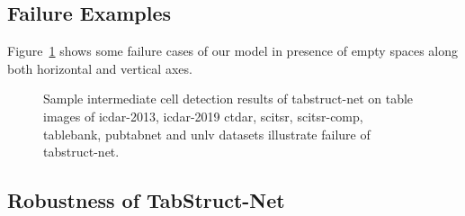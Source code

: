 \documentclass[runningheads]{llncs}
\begin{document}
\newpage
\subsection{Failure Examples}
Figure~\ref{fig_failure_cell} shows some failure cases of our model in presence of empty spaces along both horizontal and vertical axes.
\begin{figure}
\begin{center}
\hspace{-0.01\textwidth}
\hspace{-0.01\textwidth}
\vspace{0.001\textwidth}
\hspace{-0.01\textwidth}
\hspace{-0.01\textwidth}
\vspace{0.001\textwidth}
\end{center}
\caption{Sample intermediate cell detection results of {\sc t}ab{\sc s}truct-{\sc n}et on table images of {\sc icdar}-2013, {\sc icdar}-2019 c{\sc td}a{\sc r},  {\sc s}ci{\sc tsr}, {\sc s}ci{\sc tsr-comp}, {\sc t}able{\sc b}ank, {\sc p}ub{\sc t}ab{\sc n}et and {\sc unlv} datasets illustrate failure of {\sc t}ab{\sc s}truct-{\sc n}et.} \label{fig_failure_cell}
\end{figure}
\newpage
\subsection{Robustness of TabStruct-Net}
\end{document}
